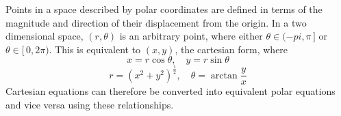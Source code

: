 \documentclass{article}
\begin{document}
\begin{multicols}{2}

    \begin{center}


    \end{center}

    \noindent Points in a space described by polar coordinates are defined in
    terms of the magnitude and direction of their displacement from the origin.
    In a two dimensional space, \(\left(r, \theta\right)\) is an arbitrary
    point, where either \(\theta \in (-pi, \pi\,]\) or \(\theta \in [\,0,
    2\pi)\). This is equivalent to \((x, y)\), the cartesian form, where \[x =
    r\cos\theta, \quad y = r\sin\theta\] \[r = \left(x^2 +
    y^2\right)^{\frac{1}{2}}, \quad \theta = \arctan\frac{y}{x}\] Cartesian
    equations can therefore be converted into equivalent polar equations and
    vice versa using these relationships. 

\end{multicols}
\end{document}
